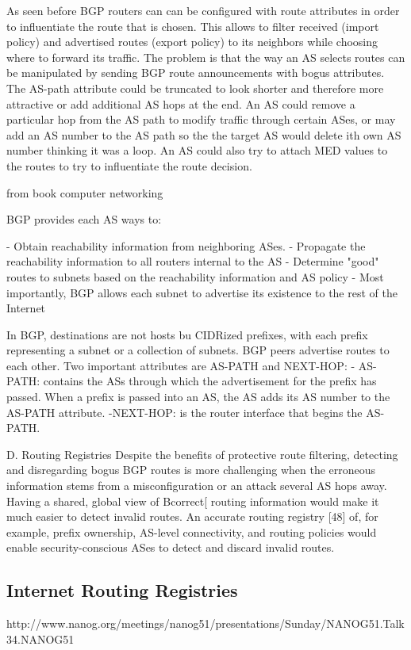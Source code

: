 \documentclass[11pt]{report}
\begin{document}
As seen before BGP routers can can be configured with route attributes in order to influentiate the route that is chosen. This allows to filter received (import policy) and advertised routes (export policy) to its neighbors while choosing where to forward its traffic. The problem is that the way an AS selects routes can be manipulated by sending BGP route announcements with bogus attributes. The AS-path attribute could be truncated to look shorter and therefore more attractive or add additional AS hops at the end. An AS could remove a particular hop from the AS path to modify traffic through certain ASes, or may add an AS number to the AS path so the the target AS would delete ith own AS number thinking it was a loop. An AS could also try to attach MED values to the routes to try to influentiate the route decision. 

from book computer networking

BGP provides each AS ways  to:

- Obtain reachability information from neighboring ASes.
- Propagate the reachability information to all routers internal to the AS
- Determine "good" routes to subnets based on the reachability information and AS policy
- Most importantly, BGP allows each subnet to advertise its existence to the rest of the Internet

In BGP, destinations are not hosts bu CIDRized prefixes, with each prefix representing a subnet or a collection of subnets. BGP peers advertise routes to each other. Two important attributes are AS-PATH and NEXT-HOP:
 - AS-PATH: contains the ASs through which the advertisement for the prefix has passed. When a prefix is passed into an AS, the AS adds its AS number to the AS-PATH attribute.
 -NEXT-HOP: is the router interface that begins the AS-PATH. 



D. Routing Registries
Despite the benefits of protective route filtering,
detecting and disregarding bogus BGP routes is more
challenging when the erroneous information stems from a
misconfiguration or an attack several AS hops away.
Having a shared, global view of Bcorrect[ routing
information would make it much easier to detect invalid
routes. An accurate routing registry [48] of, for example,
prefix ownership, AS-level connectivity, and routing
policies would enable security-conscious ASes to detect
and discard invalid routes. 


\subsection{Internet Routing Registries}
http://www.nanog.org/meetings/nanog51/presentations/Sunday/NANOG51.Talk34.NANOG51%
\end{document}
